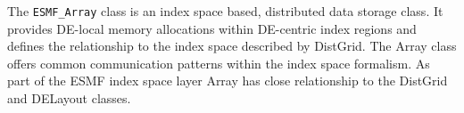 
The {\tt ESMF\_Array} class is an index space based, distributed data storage class. It provides DE-local memory allocations within DE-centric index regions and defines the relationship to the index space described by DistGrid. The Array class offers common communication patterns within the index space formalism. As part of the ESMF index space layer Array has close relationship to the DistGrid and DELayout classes.
